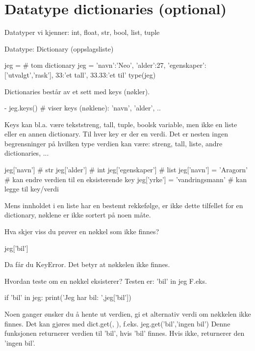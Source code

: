\section{Datatype dictionaries (optional)}

Datatyper vi kjenner: int, float, str, bool, list, tuple 

Datatype: Dictionary (oppslagsliste)

\begin{usncodebox}
jeg = {}  # tom dictionary
jeg = {'navn':'Neo', 'alder':27, 'egenskaper':['utvalgt','rask'], 33:'et tall', 33.33:'et til'} 
type(jeg) 
\end{usncodebox}

Dictionaries består av et sett med keys (nøkler).
\begin{usncodebox}
- jeg.keys()  # viser keys (nøklene): 'navn', 'alder', ..
\end{usncodebox}

Keys kan bl.a. være tekststreng, tall, tuple, boolsk variable, men ikke en liste eller en annen dictionary. Til hver key er der en verdi.  Det er nesten ingen begrensninger på hvilken type verdien kan være: streng, tall, liste, andre dictionaries, ...

\begin{usncodebox}
jeg['navn']         # str
jeg['alder']        # int
jeg['egenskaper']   # list
jeg['navn'] = 'Aragorn'        # kan endre verdien til en eksisterende key
jeg['yrke'] = 'vandringsmann'  # kan legge til key/verdi 
\end{usncodebox}

Mens innholdet i en liste har en bestemt rekkefølge, er ikke dette tilfellet for en dictionary, nøklene er ikke sortert på noen måte.

Hva skjer viss du prøver en nøkkel som ikke finnes?
\begin{usncodebox}
jeg['bil']
\end{usncodebox}

Da får du KeyError. Det betyr at nøkkelen ikke finnes.

Hvordan teste om en nøkkel eksisterer? Testen er: 'bil' in jeg
F.eks.
\begin{usncodebox}
if 'bil' in jeg:
   print('Jeg har bil: ',jeg['bil'])
\end{usncodebox}

Noen ganger ønsker du å hente ut verdien, gi et alternativ verdi om nøkkelen ikke finnes. Det kan gjøres med dict.get(, ), f.eks. jeg.get('bil','ingen bil') Denne funksjonen returnerer verdien til 'bil', hvis 'bil' finnes. Hvis ikke, returnerer den 'ingen bil'.

